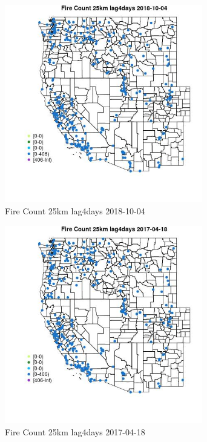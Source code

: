 \begin{figure} 
\centering  
\includegraphics[width=0.77\textwidth]{Code_Outputs/Report_ML_input_PM25_Step4_part_f_de_duplicated_aves_prioritize_24hr_obswNAs_MapObsFire_Count_25km_lag4days2018-10-04.jpg} 
\caption{\label{fig:Report_ML_input_PM25_Step4_part_f_de_duplicated_aves_prioritize_24hr_obswNAsMapObsFire_Count_25km_lag4days2018-10-04}Fire Count 25km lag4days 2018-10-04} 
\end{figure} 
 

\begin{figure} 
\centering  
\includegraphics[width=0.77\textwidth]{Code_Outputs/Report_ML_input_PM25_Step4_part_f_de_duplicated_aves_prioritize_24hr_obswNAs_MapObsFire_Count_25km_lag4days2017-04-18.jpg} 
\caption{\label{fig:Report_ML_input_PM25_Step4_part_f_de_duplicated_aves_prioritize_24hr_obswNAsMapObsFire_Count_25km_lag4days2017-04-18}Fire Count 25km lag4days 2017-04-18} 
\end{figure} 
 

